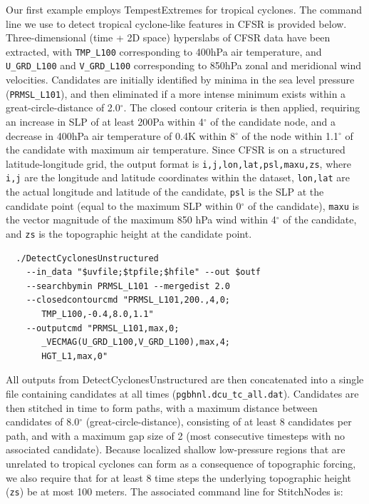 \documentclass[gmdd, hvmath, online]{copernicus_discussions}
\begin{document}
Our first example employs TempestExtremes for tropical cyclones.  The command line we use to detect tropical cyclone-like features in CFSR is provided below.  Three-dimensional (time + 2D space) hyperslabs of CFSR data have been extracted, with \texttt{TMP\_L100} corresponding to 400hPa air temperature, and \texttt{U\_GRD\_L100} and \texttt{V\_GRD\_L100} corresponding to 850hPa zonal and meridional wind velocities. Candidates are initially identified by minima in the sea level pressure (\texttt{PRMSL\_L101}), and then eliminated if a more intense minimum exists within a great-circle-distance of 2.0$^\circ$.  The closed contour criteria is then applied, requiring an increase in SLP of at least 200Pa within 4$^\circ$ of the candidate node, and a decrease in 400hPa air temperature of 0.4K within 8$^\circ$ of the node within 1.1$^\circ$ of the candidate with maximum air temperature. Since CFSR is on a structured latitude-longitude grid, the output format is \texttt{i,j,lon,lat,psl,maxu,zs}, where \texttt{i,j} are the longitude and latitude coordinates within the dataset, \texttt{lon,lat} are the actual longitude and latitude of the candidate, \texttt{psl} is the SLP at the candidate point (equal to the maximum SLP within 0$^\circ$ of the candidate), \texttt{maxu} is the vector magnitude of the maximum 850 hPa wind within 4$^\circ$ of the candidate, and \texttt{zs} is the topographic height at the candidate point.

{\small \begin{verbatim}
  ./DetectCyclonesUnstructured
    --in_data "$uvfile;$tpfile;$hfile" --out $outf
    --searchbymin PRMSL_L101 --mergedist 2.0
    --closedcontourcmd "PRMSL_L101,200.,4,0;
       TMP_L100,-0.4,8.0,1.1"
    --outputcmd "PRMSL_L101,max,0;
       _VECMAG(U_GRD_L100,V_GRD_L100),max,4;
       HGT_L1,max,0"
\end{verbatim}}

All outputs from DetectCyclonesUnstructured are then concatenated into a single file containing candidates at all times (\texttt{pgbhnl.dcu\_tc\_all.dat}).  Candidates are then stitched in time to form paths, with a maximum distance between candidates of 8.0$^\circ$ (great-circle-distance), consisting of at least 8 candidates per path, and with a maximum gap size of 2 (most consecutive timesteps with no associated candidate).  Because localized shallow low-pressure regions that are unrelated to tropical cyclones can form as a consequence of topographic forcing, we also require that for at least 8 time steps the underlying topographic height (\texttt{zs}) be at most 100 meters.  The associated command line for StitchNodes is:
\end{document}
